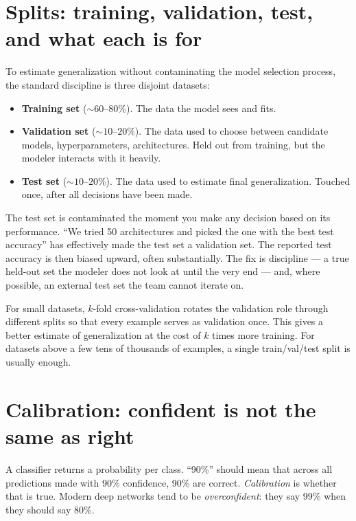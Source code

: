 \section{Splits: training, validation, test, and what each is for}

To estimate generalization without contaminating the model selection process, the standard discipline is three disjoint datasets:

\begin{itemize}
  \item \textbf{Training set} ($\sim 60$--$80\%$). The data the model sees and fits.
  \item \textbf{Validation set} ($\sim 10$--$20\%$). The data used to choose between candidate models, hyperparameters, architectures. Held out from training, but the modeler interacts with it heavily.
  \item \textbf{Test set} ($\sim 10$--$20\%$). The data used to estimate final generalization. Touched once, after all decisions have been made.
\end{itemize}

\begin{warningbox}
The test set is contaminated the moment you make any decision based on its performance. ``We tried 50 architectures and picked the one with the best test accuracy'' has effectively made the test set a validation set. The reported test accuracy is then biased upward, often substantially. The fix is discipline --- a true held-out set the modeler does not look at until the very end --- and, where possible, an external test set the team cannot iterate on.
\end{warningbox}

For small datasets, $k$-fold cross-validation rotates the validation role through different splits so that every example serves as validation once. This gives a better estimate of generalization at the cost of $k$ times more training. For datasets above a few tens of thousands of examples, a single train/val/test split is usually enough.

\section{Calibration: confident is not the same as right}

A classifier returns a probability per class. ``90\%'' should mean that across all predictions made with 90\% confidence, 90\% are correct. \emph{Calibration} is whether that is true. Modern deep networks tend to be \emph{overconfident}: they say 99\% when they should say 80\%.

